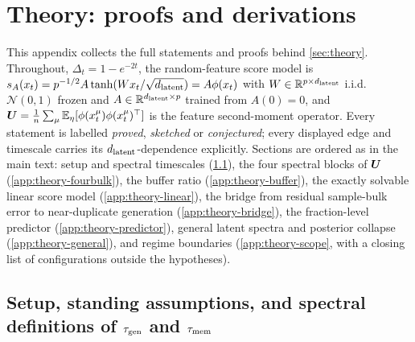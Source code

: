 \section{Theory: proofs and derivations}
\label{app:theory}

This appendix collects the full statements and proofs behind \cref{sec:theory}. Throughout, $\Delta_t=1-e^{-2t}$, the random-feature score model is $s_A(x_t)=p^{-1/2}A\tanh(Wx_t/\sqrt{d_{\mathrm{latent}}})=A\phi(x_t)$ with $W\in\mathbb{R}^{p\times d_{\mathrm{latent}}}$ i.i.d.\ $\mathcal N(0,1)$ frozen and $A\in\mathbb{R}^{d_{\mathrm{latent}}\times p}$ trained from $A(0)=0$, and $\bm{U}=\tfrac1{n}\sum_\mu\mathbb{E}_\eta[\phi(x_t^\mu)\phi(x_t^\mu)^{\top}]$ is the feature second-moment operator. Every statement is labelled \emph{proved}, \emph{sketched} or \emph{conjectured}; every displayed edge and timescale carries its $d_{\mathrm{latent}}$-dependence explicitly. Sections are ordered as in the main text: setup and spectral timescales (\cref{app:theory-setup}), the four spectral blocks of $\bm{U}$ (\cref{app:theory-fourbulk}), the buffer ratio (\cref{app:theory-buffer}), the exactly solvable linear score model (\cref{app:theory-linear}), the bridge from residual sample-bulk error to near-duplicate generation (\cref{app:theory-bridge}), the fraction-level predictor (\cref{app:theory-predictor}), general latent spectra and posterior collapse (\cref{app:theory-general}), and regime boundaries (\cref{app:theory-scope}, with a closing list of configurations outside the hypotheses).

\subsection{Setup, standing assumptions, and spectral definitions of \texorpdfstring{$\tau_{\mathrm{gen}}$}{tau\_gen} and \texorpdfstring{$\tau_{\mathrm{mem}}$}{tau\_mem}}
\label{app:theory-setup}

